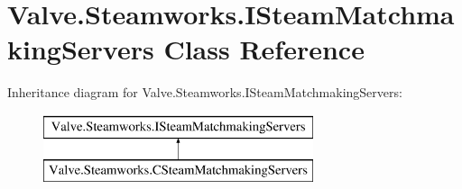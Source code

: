 \hypertarget{classValve_1_1Steamworks_1_1ISteamMatchmakingServers}{}\section{Valve.\+Steamworks.\+I\+Steam\+Matchmaking\+Servers Class Reference}
\label{classValve_1_1Steamworks_1_1ISteamMatchmakingServers}
Inheritance diagram for Valve.\+Steamworks.\+I\+Steam\+Matchmaking\+Servers\+:\begin{figure}[H]
\begin{center}
\leavevmode
\includegraphics[height=2.000000cm]{classValve_1_1Steamworks_1_1ISteamMatchmakingServers}
\end{center}
\end{figure}
